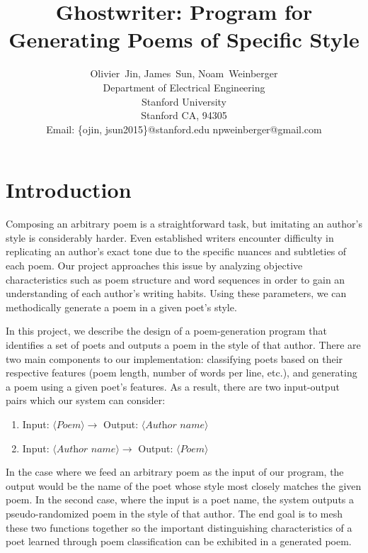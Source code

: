 \documentclass[journal]{IEEEtran}
\begin{document}
\title{Ghostwriter: Program for Generating Poems of Specific Style}

\author{Olivier~Jin, James~Sun, Noam~Weinberger
        \\
        Department of Electrical Engineering\\
        Stanford University\\
        Stanford CA, 94305\\
        Email: \{ojin, jsun2015\}@stanford.edu npweinberger@gmail.com} 


\maketitle




\section{Introduction}
Composing an arbitrary poem is a straightforward task, but imitating an author’s style is considerably harder. Even established writers encounter difficulty in replicating an author’s exact tone due to the specific nuances and subtleties of each poem. Our project approaches this issue by analyzing objective characteristics such as poem structure and word sequences in order to gain an understanding of each author’s writing habits. Using these parameters, we can methodically generate a poem in a given poet’s style.

In this project, we describe the design of a poem-generation program that identifies a set of poets and outputs a poem in the style of that author. There are two main components to our implementation: classifying poets based on their respective features (poem length, number of words per line, etc.), and generating a poem using a given poet’s features. As a result, there are two input-output pairs which our system can consider:
\begin{enumerate}
    \item Input: $\langle\textit{Poem}\rangle \rightarrow$ Output: $\langle\textit{Author name}\rangle$
    \item Input: $\langle\textit{Author name}\rangle \rightarrow$ Output: $\langle\textit{Poem}\rangle$
\end{enumerate}
In the case where we feed an arbitrary poem as the input of our program, the output would be the name of the poet whose style most closely matches the given poem. In the second case, where the input is a poet name, the system outputs a pseudo-randomized poem in the style of that author. The end goal is to mesh these two functions together so the important distinguishing characteristics of a poet learned through poem classification can be exhibited in a generated poem.
\end{document}
